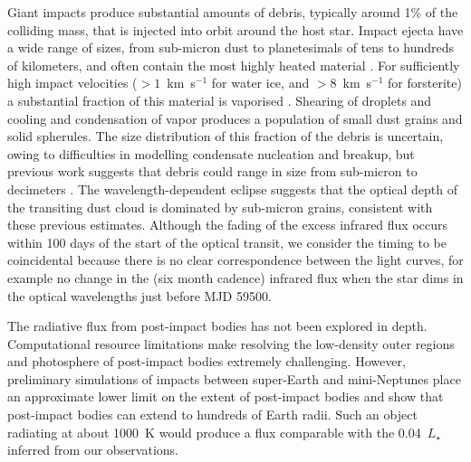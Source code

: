 \documentclass[sn-nature,oneside]{sn-jnl}%
\begin{document}
Giant impacts produce substantial amounts of debris, typically around 1\% of the colliding mass, that is injected into orbit around the host star\cite{Canup2001,Lock18}.
%
Impact ejecta have a wide range of sizes, from sub-micron dust to planetesimals of tens to hundreds of kilometers, and often contain the most highly heated material \cite{Benz2008_Mercury_book,Leinhardt2015,Carter2020a}.
%
For sufficiently high impact velocities ($>1$~km~s$^{-1}$ for water ice, and $>8$~km~s$^{-1}$ for forsterite) a substantial fraction of this material is vaporised \cite{Stewart2008,Davies2020,Carter2020a}.
%
Shearing of droplets and cooling and condensation of vapor produces a population of small dust grains and solid spherules.
%
The size distribution of this fraction of the debris is uncertain, owing to difficulties in modelling condensate nucleation and breakup, but previous work suggests that debris could range in size from sub-micron to decimeters \cite{Benz2008_Mercury_book,Johnson2015}.
%
The wavelength-dependent eclipse suggests that the optical depth of the transiting dust cloud is dominated by sub-micron grains, consistent with these previous estimates.
%
Although the fading of the excess infrared flux occurs within 100 days of the start of the optical transit, we consider the timing to be coincidental because there is no clear correspondence between the light curves, for example no  change in the (six month cadence) infrared flux when the star dims in the optical wavelengths just before MJD 59500.




The radiative flux from post-impact bodies has not been explored in depth.
%
Computational resource limitations make resolving the low-density outer regions and photosphere of post-impact bodies extremely challenging.
%
However, preliminary simulations of impacts between super-Earth and mini-Neptunes place an approximate lower limit on the extent of post-impact bodies and show that post-impact bodies can extend to hundreds of Earth radii.
%
Such an object radiating at about 1000~K would produce a flux comparable with the 0.04~$L_\star$ inferred from our observations. 
\end{document}
